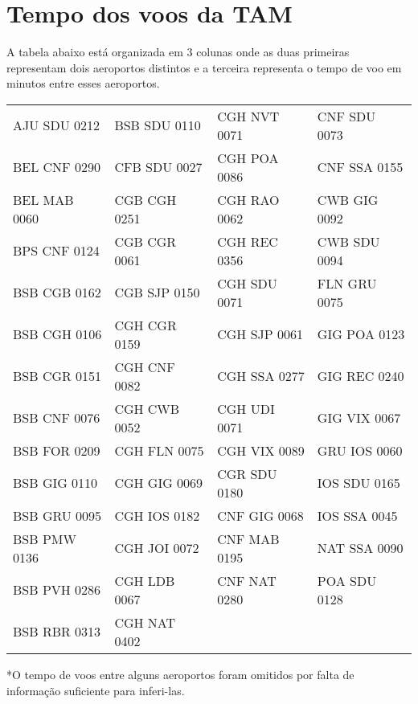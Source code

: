 \chapter{Tempo dos voos da TAM}\label{anx:timetam}


A tabela abaixo está organizada em 3 colunas onde as duas primeiras representam
dois aeroportos distintos e a terceira representa o tempo de voo em minutos
entre esses aeroportos.

\begin{scriptsize}

\begin{longtable}{l l l l}



AJU SDU 0212 & BSB SDU 0110 & CGH NVT 0071 & CNF SDU 0073 \\
BEL CNF 0290 & CFB SDU 0027 & CGH POA 0086 & CNF SSA 0155 \\
BEL MAB 0060 & CGB CGH 0251 & CGH RAO 0062 & CWB GIG 0092 \\
BPS CNF 0124 & CGB CGR 0061 & CGH REC 0356 & CWB SDU 0094 \\
BSB CGB 0162 & CGB SJP 0150 & CGH SDU 0071 & FLN GRU 0075 \\
BSB CGH 0106 & CGH CGR 0159 & CGH SJP 0061 & GIG POA 0123 \\
BSB CGR 0151 & CGH CNF 0082 & CGH SSA 0277 & GIG REC 0240 \\
BSB CNF 0076 & CGH CWB 0052 & CGH UDI 0071 & GIG VIX 0067 \\
BSB FOR 0209 & CGH FLN 0075 & CGH VIX 0089 & GRU IOS 0060 \\
BSB GIG 0110 & CGH GIG 0069 & CGR SDU 0180 & IOS SDU 0165 \\
BSB GRU 0095 & CGH IOS 0182 & CNF GIG 0068 & IOS SSA 0045 \\
BSB PMW 0136 & CGH JOI 0072 & CNF MAB 0195 & NAT SSA 0090 \\
BSB PVH 0286 & CGH LDB 0067 & CNF NAT 0280 & POA SDU 0128 \\
BSB RBR 0313 & CGH NAT 0402 & & \\


\end{longtable}

*O tempo de voos entre alguns aeroportos foram omitidos por falta de informação suficiente para inferi-las.
\end{scriptsize}